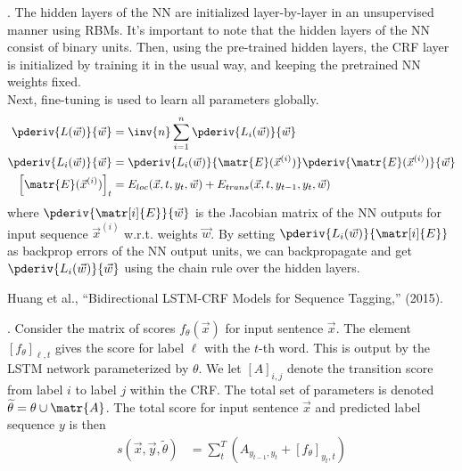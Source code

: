 \documentclass[11pt]{article}
\begin{document}
\myspace
\p {}. The hidden layers of the NN are initialized layer-by-layer in an unsupervised manner using RBMs. It's important to note that the hidden layers of the NN consist of binary units. Then, using the pre-trained hidden layers, the CRF layer is initialized by training it in the usual way, and keeping the pretrained NN weights fixed. \\

Next, fine-tuning is used to learn all parameters globally.
\begin{align}
\pderiv{L(\vec w)}{\vec w} 
&= \inv{n}\sum_{i=1}^n \pderiv{L_i(\vec w)}{\vec w} \\
\pderiv{L_i(\vec w)}{\vec w} 
&= \pderiv{L_i(\vec w)}{\matr{E}(\vec{x}^{(i)})} \pderiv{\matr{E}(\vec{x}^{(i)})}{\vec w} \\
\left[ \matr{E}(\vec{x}^{(i)}) \right]_t	
&= E_{loc}(\vec x, t, y_t, \vec w) + E_{trans}(\vec x, t, y_{t-1}, y_t, \vec w) \\
\end{align}
where $\pderiv{\matr[i]{E}}{\vec w}$ is the Jacobian matrix of the NN outputs for input sequence $\vec{x}^{(i)}$ w.r.t. weights $\vec w$. By setting $\pderiv{L_i(\vec w)}{\matr[i]{E}}$ as backprop errors of the NN output units, we can backpropagate and get $\pderiv{L_i(\vec w)}{\vec w}$ using the chain rule over the hidden layers.




\vspace{-1em}
{\footnotesize Huang et al., ``Bidirectional LSTM-CRF Models for Sequence Tagging,'' (2015).}

\p {}. Consider the matrix of scores $f_{\theta}(\vec x)$ for input sentence $\vec x$. The element $\left[ f_{\theta} \right]_{\ell, t}$ gives the score for label $\ell$ with the $t$-th word. This is output by the LSTM network parameterized by $\theta$. We let $[A]_{i,j}$ denote the transition score from label $i$ to label $j$ within the CRF. The total set of parameters is denoted $\widetilde{\theta} = \theta \cup \matr{A}$. The total score for input sentence $\vec x$ and predicted label sequence $y$ is then 
\begin{align}
s(\vec x, \vec y, \widetilde{\theta}) &= \sum_t^T \left(   A_{y_{t-1}, y_t} + \left[ f_{\theta}  \right]_{y_t, t}  \right)
\end{align}
\end{document}
